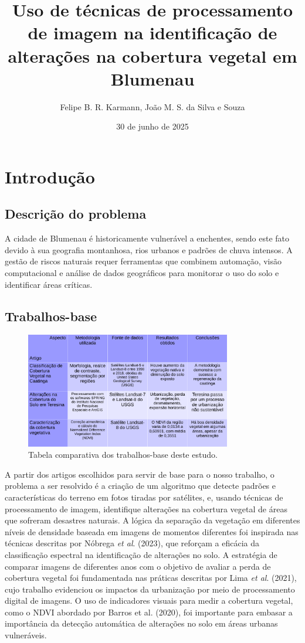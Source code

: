 \documentclass{article}
\author{Felipe B. R. Karmann, João M. S. da Silva e Souza}
\date{30 de junho de 2025}
\title{Uso de técnicas de processamento de imagem na identificação de alterações na cobertura vegetal em Blumenau}
\begin{document}
\maketitle

\section{Introdução}
\subsection{Descrição do problema}

A cidade de Blumenau é historicamente vulnerável a enchentes, sendo este fato devido à sua geografia montanhosa, rios urbanos e padrões de chuva intensos. A gestão de riscos naturais requer ferramentas que combinem automação, visão computacional e análise de dados geográficos para monitorar o uso do solo e identificar áreas críticas.

\subsection{Trabalhos-base}

\begin{figure}[H]
  \centering
  \includegraphics[width=0.8\textwidth]{../tabela.png}
  \caption{Tabela comparativa dos trabalhos-base deste estudo.}
  \label{Tabela comparativa}
\end{figure}

A partir dos artigos escolhidos para servir de base para o nosso trabalho, o problema a ser resolvido é a criação de um algoritmo que detecte padrões e características do terreno em fotos tiradas por satélites, e, usando técnicas de processamento de imagem, identifique alterações na cobertura vegetal de áreas que sofreram desastres naturais. A lógica da separação da vegetação em diferentes níveis de densidade baseada em imagens de momentos diferentes foi inspirada nas técnicas descritas por Nóbrega \textit{et al}. (2023)\cite{artigo01}, que reforçam a eficácia da classificação espectral na identificação de alterações no solo. A estratégia de comparar imagens de diferentes anos com o objetivo de avaliar a perda de cobertura vegetal foi fundamentada nas práticas descritas por Lima \textit{et al}. (2021)\cite{artigo03}, cujo trabalho evidenciou os impactos da urbanização por meio de processamento digital de imagens. O uso de indicadores visuais para medir a cobertura vegetal, como o NDVI abordado por Barros {et al}. (2020)\cite{artigo02}, foi importante para embasar a importância da detecção automática de alterações no solo em áreas urbanas vulneráveis.
\end{document}
